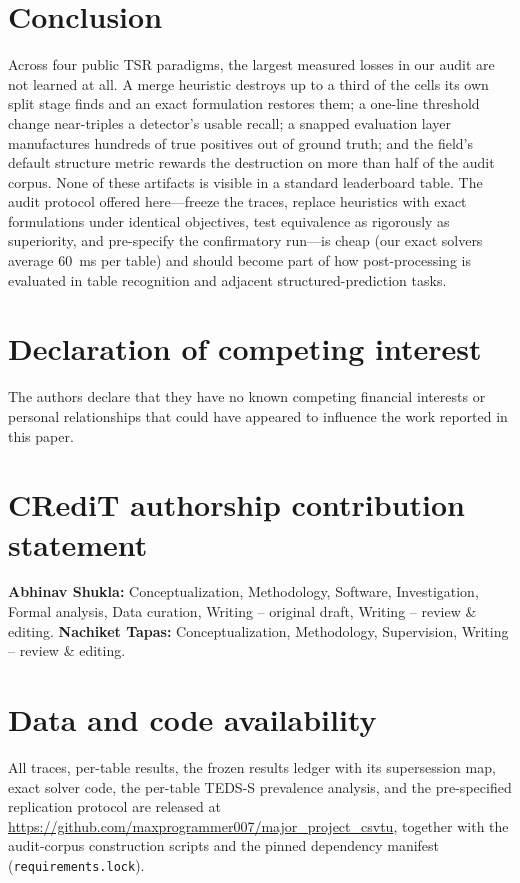 \documentclass[final,5p,times,twocolumn]{elsarticle}
\begin{document}
\section{Conclusion}\label{sec:conclusion}

Across four public TSR paradigms, the largest measured losses in our audit
are not learned at all. A merge heuristic destroys up to a third of the
cells its own split stage finds and an exact formulation restores them; a
one-line threshold change near-triples a detector's usable recall; a snapped
evaluation layer
manufactures hundreds of true positives out of ground truth; and the field's
default structure metric rewards the destruction on more than half of the
audit corpus. None of these artifacts is
visible in a standard leaderboard table. The audit protocol offered here---freeze the
traces, replace heuristics with exact formulations under identical
objectives, test equivalence as rigorously as superiority, and pre-specify
the confirmatory run---is cheap (our exact solvers average 60~ms per table)
and should become part of how post-processing is evaluated
in table recognition and adjacent structured-prediction tasks.

\section*{Declaration of competing interest}
The authors declare that they have no known competing financial interests or
personal relationships that could have appeared to influence the work reported
in this paper.

\section*{CRediT authorship contribution statement}
\textbf{Abhinav Shukla:} Conceptualization, Methodology, Software,
Investigation, Formal analysis, Data curation, Writing -- original draft,
Writing -- review \& editing.
\textbf{Nachiket Tapas:} Conceptualization, Methodology, Supervision,
Writing -- review \& editing.

\section*{Data and code availability}
All traces, per-table results, the frozen results ledger with its
supersession map, exact solver code, the per-table TEDS-S prevalence
analysis, and the pre-specified replication protocol are released at
\url{https://github.com/maxprogrammer007/major_project_csvtu}, together with
the audit-corpus construction scripts and the pinned dependency manifest
(\texttt{requirements.lock}).
\end{document}
